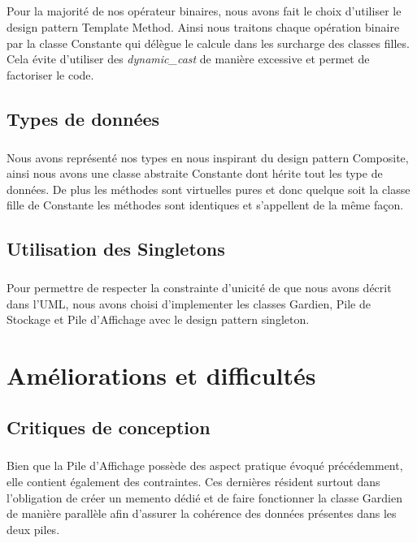 \documentclass[a4paper,11pt]{report}
\begin{document}
			\paragraph{}Pour la majorité de nos opérateur binaires, nous avons fait le choix d'utiliser le design pattern Template Method. Ainsi nous traitons chaque opération binaire par la classe Constante qui délègue le calcule dans les surcharge des classes filles. Cela évite d’utiliser des \emph{dynamic\_cast} de manière excessive et permet de factoriser le code.

	\section{Types de données}
		\paragraph{}Nous avons représenté nos types en nous inspirant du design pattern Composite, ainsi nous avons une classe abstraite Constante dont hérite tout les type de données. De plus les méthodes sont virtuelles pures et donc quelque soit la classe fille de Constante les méthodes sont identiques et s'appellent de la même façon.
		
	\section{Utilisation des Singletons}
		\paragraph{}Pour permettre de respecter la constrainte d'unicité de que nous avons décrit dans l'UML, nous avons choisi d'implementer les classes Gardien, Pile de Stockage et Pile d'Affichage avec le design pattern singleton.
		
\chapter{Améliorations et difficultés}

	\section{Critiques de conception}
		\paragraph{}Bien que la Pile d'Affichage possède des aspect pratique évoqué précédemment, elle contient également des contraintes. Ces dernières résident surtout dans l'obligation de créer un memento dédié et de faire fonctionner la classe Gardien de manière parallèle afin d'assurer la cohérence des données présentes dans les deux piles.
		
\end{document}
